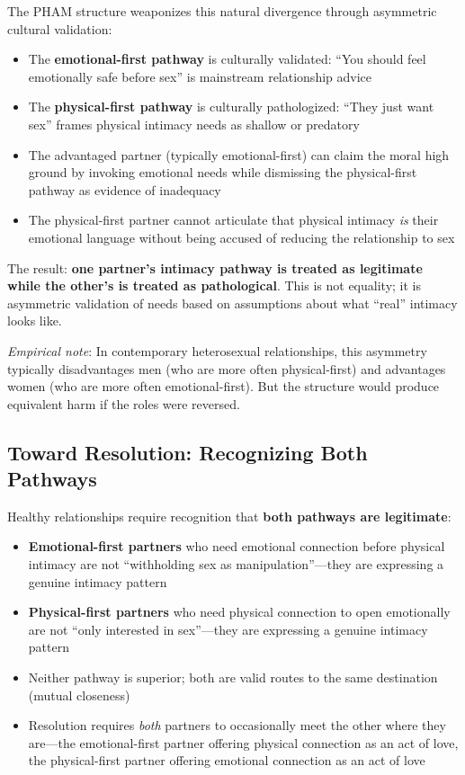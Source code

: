 \documentclass[12pt,openany]{book}
\numberwithin{equation}{chapter}
\begin{document}
The PHAM structure weaponizes this natural divergence through asymmetric cultural validation:

\begin{itemize}
    \item The \textbf{emotional-first pathway} is culturally validated: ``You should feel emotionally safe before sex'' is mainstream relationship advice
    \item The \textbf{physical-first pathway} is culturally pathologized: ``They just want sex'' frames physical intimacy needs as shallow or predatory
    \item The advantaged partner (typically emotional-first) can claim the moral high ground by invoking emotional needs while dismissing the physical-first pathway as evidence of inadequacy
    \item The physical-first partner cannot articulate that physical intimacy \textit{is} their emotional language without being accused of reducing the relationship to sex
\end{itemize}

The result: \textbf{one partner's intimacy pathway is treated as legitimate while the other's is treated as pathological}. This is not equality; it is asymmetric validation of needs based on assumptions about what ``real'' intimacy looks like.

\textit{Empirical note}: In contemporary heterosexual relationships, this asymmetry typically disadvantages men (who are more often physical-first) and advantages women (who are more often emotional-first). But the structure would produce equivalent harm if the roles were reversed.

\subsection{Toward Resolution: Recognizing Both Pathways}

Healthy relationships require recognition that \textbf{both pathways are legitimate}:

\begin{itemize}
    \item \textbf{Emotional-first partners} who need emotional connection before physical intimacy are not ``withholding sex as manipulation''---they are expressing a genuine intimacy pattern
    \item \textbf{Physical-first partners} who need physical connection to open emotionally are not ``only interested in sex''---they are expressing a genuine intimacy pattern
    \item Neither pathway is superior; both are valid routes to the same destination (mutual closeness)
    \item Resolution requires \textit{both} partners to occasionally meet the other where they are---the emotional-first partner offering physical connection as an act of love, the physical-first partner offering emotional connection as an act of love
\end{itemize}
\end{document}
